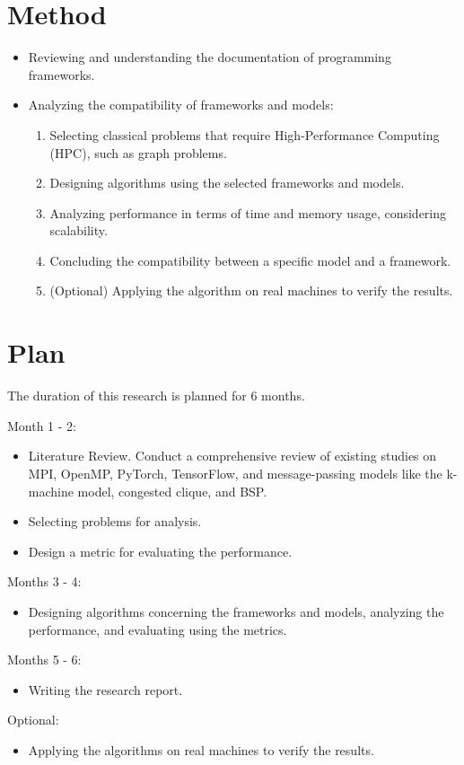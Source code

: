 \documentclass{article}
\begin{document}
\section{Method}
\begin{itemize}
  \item Reviewing and understanding the documentation of programming frameworks.
  \item Analyzing the compatibility of frameworks and models:
      \begin{enumerate}
        \item Selecting classical problems that require High-Performance Computing (HPC), such as graph problems.
        \item Designing algorithms using the selected frameworks and models.
        \item Analyzing performance in terms of time and memory usage, considering scalability.
        \item Concluding the compatibility between a specific model and a framework.
        \item (Optional) Applying the algorithm on real machines to verify the results.
      \end{enumerate}
\end{itemize}

\section{Plan}
The duration of this research is planned for 6 months.

Month 1 - 2:
\begin{itemize}
  \item Literature Review. Conduct a comprehensive review of existing studies on MPI, OpenMP, PyTorch, TensorFlow, and message-passing models like the k-machine model, congested clique, and BSP.
  \item Selecting problems for analysis.
  \item Design a metric for evaluating the performance.
\end{itemize}

Months 3 - 4:
\begin{itemize}
  \item Designing algorithms concerning the frameworks and models, analyzing the performance, and evaluating using the metrics.
\end{itemize}

Months 5 - 6:
\begin{itemize}
  \item Writing the research report.
\end{itemize}

Optional:
\begin{itemize}
  \item Applying the algorithms on real machines to verify the results.
\end{itemize}

\medskip
\nocite{*}
\printbibliography
\end{document}
